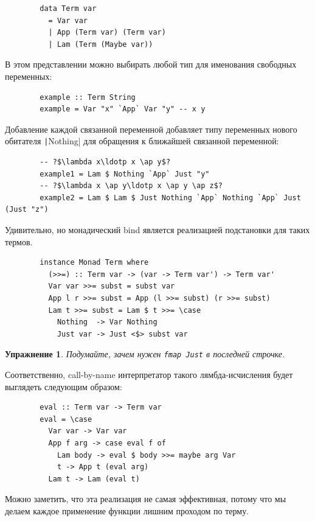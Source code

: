 \documentclass[12pt]{article}
\newcommand{\ap}{~}
\newtheorem{task}{Упражнение}
\begin{document}
    \begin{verbatim}
        data Term var
          = Var var
          | App (Term var) (Term var)
          | Lam (Term (Maybe var))
    \end{verbatim}

    В этом представлении можно выбирать любой тип для именования свободных переменных:
    \begin{verbatim}
        example :: Term String
        example = Var "x" `App` Var "y" -- x y
    \end{verbatim}
    Добавление каждой связанной переменной добавляет типу переменных нового обитателя \texttt|Nothing| для обращения к ближайшей связанной переменной:
    \begin{verbatim}
        -- ?$\lambda x\ldotp x \ap y$?
        example1 = Lam $ Nothing `App` Just "y"
        -- ?$\lambda x \ap y\ldotp x \ap y \ap z$?
        example2 = Lam $ Lam $ Just Nothing `App` Nothing `App` Just (Just "z")
    \end{verbatim}

    Удивительно, но монадический bind является реализацией подстановки для таких термов.

    \begin{verbatim}
        instance Monad Term where
          (>>=) :: Term var -> (var -> Term var') -> Term var'
          Var var >>= subst = subst var
          App l r >>= subst = App (l >>= subst) (r >>= subst)
          Lam t >>= subst = Lam $ t >>= \case
            Nothing  -> Var Nothing
            Just var -> Just <$> subst var
    \end{verbatim}

    \begin{task}
        Подумайте, зачем нужен \texttt{fmap Just} в последней строчке.
    \end{task}

    Соответственно, call-by-name интерпретатор такого лямбда-исчисления будет выглядеть следующим образом:

    \begin{verbatim}
        eval :: Term var -> Term var
        eval = \case
          Var var -> Var var
          App f arg -> case eval f of
            Lam body -> eval $ body >>= maybe arg Var
            t -> App t (eval arg)
          Lam t -> Lam (eval t)
    \end{verbatim}

    Можно заметить, что эта реализация не самая эффективная, потому что мы делаем каждое применение функции лишним проходом по терму.
\end{document}
